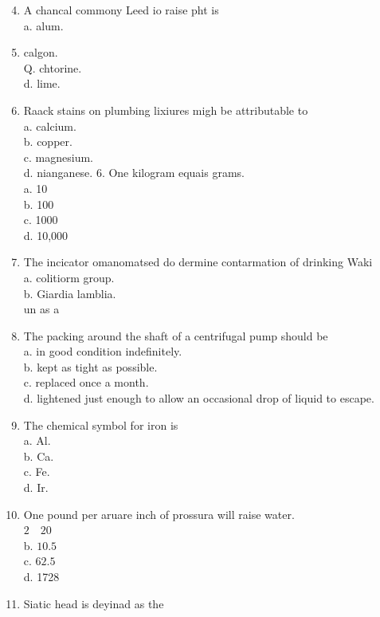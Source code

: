 \documentclass[10pt]{article}
\begin{document}
\begin{enumerate}
  \setcounter{enumi}{3}
  \item A chancal commony Leed io raise pht is\\
a. alum.

  \item calgon.\\
Q. chtorine.\\
d. lime.

  \item Raack stains on plumbing lixiures migh be attributable to\\
a. calcium.\\
b. copper.\\
c. magnesium.\\
d. nianganese. 6. One kilogram equais grams.\\
a. 10\\
b. 100\\
c. 1000\\
d. 10,000

  \item The incicator omanomatsed do dermine contarmation of drinking Waki \\
a. colitiorm group.\\
b. Giardia lamblia.\\
un as a


  \item The packing around the shaft of a centrifugal pump should be\\
a. in good condition indefinitely.\\
b. kept as tight as possible.\\
c. replaced once a month.\\
d. lightened just enough to allow an occasional drop of liquid to escape.

  \item The chemical symbol for iron is\\
a. Al.\\
b. Ca.\\
c. Fe.\\
d. Ir.

  \item One pound per aruare inch of prossura will raise water.\\
$2 \quad 20$\\
b. $10.5$\\
c. $62.5$\\
d. 1728

  \item Siatic head is deyinad as the

\end{enumerate}
\end{document}
